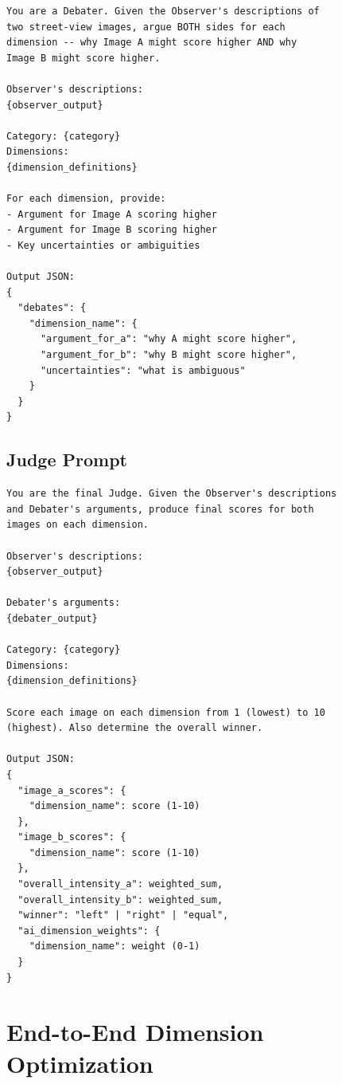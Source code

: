 \documentclass[runningheads]{llncs}
\begin{document}
\begin{lstlisting}[caption={Debater agent prompt (Stage 2, Mode 4).}]
You are a Debater. Given the Observer's descriptions of
two street-view images, argue BOTH sides for each
dimension -- why Image A might score higher AND why
Image B might score higher.

Observer's descriptions:
{observer_output}

Category: {category}
Dimensions:
{dimension_definitions}

For each dimension, provide:
- Argument for Image A scoring higher
- Argument for Image B scoring higher
- Key uncertainties or ambiguities

Output JSON:
{
  "debates": {
    "dimension_name": {
      "argument_for_a": "why A might score higher",
      "argument_for_b": "why B might score higher",
      "uncertainties": "what is ambiguous"
    }
  }
}
\end{lstlisting}

\subsection{Judge Prompt}

\begin{lstlisting}[caption={Judge agent prompt (Stage 2, Mode 4).}]
You are the final Judge. Given the Observer's descriptions
and Debater's arguments, produce final scores for both
images on each dimension.

Observer's descriptions:
{observer_output}

Debater's arguments:
{debater_output}

Category: {category}
Dimensions:
{dimension_definitions}

Score each image on each dimension from 1 (lowest) to 10
(highest). Also determine the overall winner.

Output JSON:
{
  "image_a_scores": {
    "dimension_name": score (1-10)
  },
  "image_b_scores": {
    "dimension_name": score (1-10)
  },
  "overall_intensity_a": weighted_sum,
  "overall_intensity_b": weighted_sum,
  "winner": "left" | "right" | "equal",
  "ai_dimension_weights": {
    "dimension_name": weight (0-1)
  }
}
\end{lstlisting}

\section{End-to-End Dimension Optimization}
\label{sec:e2e}
\end{document}
